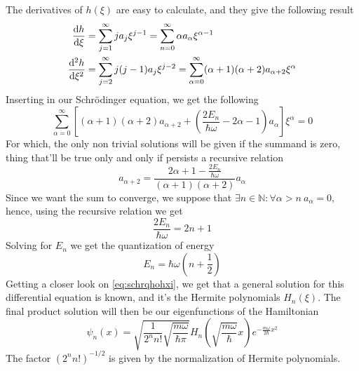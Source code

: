 \documentclass[../qm.tex]{subfiles}
\begin{document}
	The derivatives of $h(\xi)$ are easy to calculate, and they give the following result
	\begin{equation*}
		\begin{aligned}
			\derivative{h}{\xi}&=\sum_{j=1}^{\infty}ja_j\xi^{j-1}=\sum_{n=0}^{\infty}\alpha a_{\alpha}\xi^{\alpha-1}\\
			\derivative[2]{h}{\xi}&=\sum_{j=2}^{\infty}j(j-1)a_j\xi^{j-2}=\sum_{\alpha=0}^{\infty}(\alpha+1)(\alpha+2)a_{\alpha+2}\xi^{\alpha}
		\end{aligned}
	\end{equation*}
	Inserting in our Schrödinger equation, we get the following
	\begin{equation*}
		\sum_{\alpha=0}^{\infty}\left[ (\alpha+1)(\alpha+2)a_{\alpha+2}+\left( \frac{2E_n}{\hbar\omega}-2\alpha-1 \right)a_{\alpha} \right]\xi^{\alpha}=0
	\end{equation*}
	For which, the only non trivial solutions will be given if the summand is zero, thing that'll be true only and only if persists a recursive relation
	\begin{equation}
		a_{\alpha+2}=\frac{2\alpha+1-\frac{2E_n}{\hbar\omega}}{(\alpha+1)(\alpha+2)}a_{\alpha}
		\label{eq:recrelation}
	\end{equation}
	Since we want the sum to converge, we suppose that $\exists n\in\mathbb{N}:\forall \alpha>n\ a_{\alpha}=0$, hence, using the recursive relation we get
	\begin{equation}
		\frac{2E_n}{\hbar\omega}=2n+1
		\label{eq:energyquant}
	\end{equation}
	Solving for $E_n$ we get the quantization of energy
	\begin{equation}
		E_n=\hbar\omega\left( n+\frac{1}{2} \right)
		\label{eq:energyquantschrqho}
	\end{equation}
	Getting a closer look on \eqref{eq:schrqhohxi}, we get that a general solution for this differential equation is known, and it's the Hermite polynomials $H_n(\xi)$. The final product solution will then be our eigenfunctions of the Hamiltonian
	\begin{equation}
		\psi_{n}(x)=\sqrt{\frac{1}{2^nn!}\sqrt{\frac{m\omega}{\hbar\pi}}}H_n\left( \sqrt{\frac{m\omega}{\hbar}}x \right)e^{-\frac{m\omega}{2\hbar}x^2}
		\label{eq:finalsolutionschrqho}
	\end{equation}
	The factor $(2^nn!)^{-1/2}$ is given by the normalization of Hermite polynomials.
\end{document}
